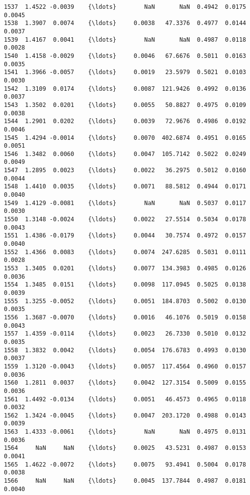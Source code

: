 \documentclass[11pt]{article}
\begin{document}
\begin{Verbatim}[commandchars=\\\{\}]
1537  1.4522 -0.0039    {\ldots}        NaN       NaN  0.4942  0.0175  0.0045   
1538  1.3907  0.0074    {\ldots}     0.0038   47.3376  0.4977  0.0144  0.0037   
1539  1.4167  0.0041    {\ldots}        NaN       NaN  0.4987  0.0118  0.0028   
1540  1.4158 -0.0029    {\ldots}     0.0046   67.6676  0.5011  0.0163  0.0035   
1541  1.3966 -0.0057    {\ldots}     0.0019   23.5979  0.5021  0.0103  0.0030   
1542  1.3109  0.0174    {\ldots}     0.0087  121.9426  0.4992  0.0136  0.0037   
1543  1.3502  0.0201    {\ldots}     0.0055   50.8827  0.4975  0.0109  0.0038   
1544  1.2901  0.0202    {\ldots}     0.0039   72.9676  0.4986  0.0192  0.0046   
1545  1.4294 -0.0014    {\ldots}     0.0070  402.6874  0.4951  0.0165  0.0051   
1546  1.3482  0.0060    {\ldots}     0.0047  105.7142  0.5022  0.0249  0.0049   
1547  1.2895  0.0023    {\ldots}     0.0022   36.2975  0.5012  0.0160  0.0044   
1548  1.4410  0.0035    {\ldots}     0.0071   88.5812  0.4944  0.0171  0.0040   
1549  1.4129 -0.0081    {\ldots}        NaN       NaN  0.5037  0.0117  0.0030   
1550  1.3148 -0.0024    {\ldots}     0.0022   27.5514  0.5034  0.0178  0.0043   
1551  1.4386 -0.0179    {\ldots}     0.0044   30.7574  0.4972  0.0157  0.0040   
1552  1.4366  0.0083    {\ldots}     0.0074  247.6285  0.5031  0.0111  0.0028   
1553  1.3405  0.0201    {\ldots}     0.0077  134.3983  0.4985  0.0126  0.0036   
1554  1.3485  0.0151    {\ldots}     0.0098  117.0945  0.5025  0.0138  0.0039   
1555  1.3255 -0.0052    {\ldots}     0.0051  184.8703  0.5002  0.0130  0.0035   
1556  1.3687 -0.0070    {\ldots}     0.0016   46.1076  0.5019  0.0158  0.0043   
1557  1.4359 -0.0114    {\ldots}     0.0023   26.7330  0.5010  0.0132  0.0035   
1558  1.3832  0.0042    {\ldots}     0.0054  176.6783  0.4993  0.0130  0.0037   
1559  1.3120 -0.0043    {\ldots}     0.0057  117.4564  0.4960  0.0157  0.0036   
1560  1.2811  0.0037    {\ldots}     0.0042  127.3154  0.5009  0.0155  0.0036   
1561  1.4492 -0.0134    {\ldots}     0.0051   46.4573  0.4965  0.0118  0.0032   
1562  1.3424 -0.0045    {\ldots}     0.0047  203.1720  0.4988  0.0143  0.0039   
1563  1.4333 -0.0061    {\ldots}        NaN       NaN  0.4975  0.0131  0.0036   
1564     NaN     NaN    {\ldots}     0.0025   43.5231  0.4987  0.0153  0.0041   
1565  1.4622 -0.0072    {\ldots}     0.0075   93.4941  0.5004  0.0178  0.0038   
1566     NaN     NaN    {\ldots}     0.0045  137.7844  0.4987  0.0181  0.0040   


\end{Verbatim}
\end{document}

